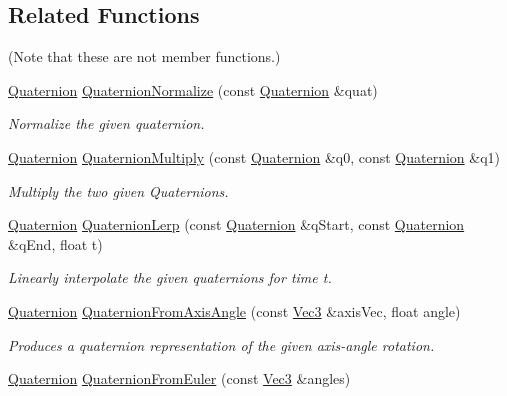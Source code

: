 \subsection*{Related Functions}
(Note that these are not member functions.) {\bf }\par
\begin{DoxyCompactItemize}
\item 
\hyperlink{classgofxmath_1_1_quaternion}{Quaternion} \hyperlink{classgofxmath_1_1_quaternion_a0b4dfb2804fb5c44a112dc6b8ea43278}{Quaternion\+Normalize} (const \hyperlink{classgofxmath_1_1_quaternion}{Quaternion} \&quat)
\begin{DoxyCompactList}\small\item\em Normalize the given quaternion. \end{DoxyCompactList}\item 
\hyperlink{classgofxmath_1_1_quaternion}{Quaternion} \hyperlink{classgofxmath_1_1_quaternion_a01d5534572884ea932229ccb1aa17ac1}{Quaternion\+Multiply} (const \hyperlink{classgofxmath_1_1_quaternion}{Quaternion} \&q0, const \hyperlink{classgofxmath_1_1_quaternion}{Quaternion} \&q1)
\begin{DoxyCompactList}\small\item\em Multiply the two given Quaternions. \end{DoxyCompactList}\item 
\hyperlink{classgofxmath_1_1_quaternion}{Quaternion} \hyperlink{classgofxmath_1_1_quaternion_a7d4ad4615b2edcd99e9dcf6f0afe74ca}{Quaternion\+Lerp} (const \hyperlink{classgofxmath_1_1_quaternion}{Quaternion} \&q\+Start, const \hyperlink{classgofxmath_1_1_quaternion}{Quaternion} \&q\+End, float t)
\begin{DoxyCompactList}\small\item\em Linearly interpolate the given quaternions for time t. \end{DoxyCompactList}\item 
\hyperlink{classgofxmath_1_1_quaternion}{Quaternion} \hyperlink{classgofxmath_1_1_quaternion_abbc754cd1e171bd2d945376bb8a39a8f}{Quaternion\+From\+Axis\+Angle} (const \hyperlink{classgofxmath_1_1_vec3}{Vec3} \&axis\+Vec, float angle)
\begin{DoxyCompactList}\small\item\em Produces a quaternion representation of the given axis-\/angle rotation. \end{DoxyCompactList}\item 
\hyperlink{classgofxmath_1_1_quaternion}{Quaternion} \hyperlink{classgofxmath_1_1_quaternion_a6ea767e2a30159fd9c671ce16e949e38}{Quaternion\+From\+Euler} (const \hyperlink{classgofxmath_1_1_vec3}{Vec3} \&angles)

\end{DoxyCompactItemize}
